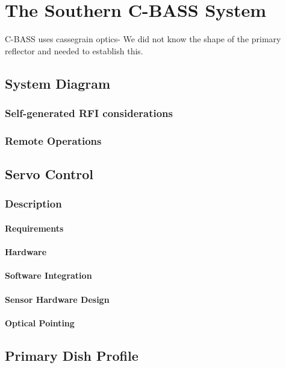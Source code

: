 \chapter{The Southern C-BASS System}
C-BASS uses cassegrain optics- We did not know the shape of the primary reflector and needed to establish this.

\section{System Diagram}
  \subsection{Self-generated RFI considerations}
  \subsection{Remote Operations}

\section{Servo Control}

  \subsection{Description}

    \subsubsection{Requirements}
    \subsubsection{Hardware}
    \subsubsection{Software Integration}

  \subsubsection{Sensor Hardware Design}


    \subsubsection{Optical Pointing}


\section{Primary Dish Profile}
